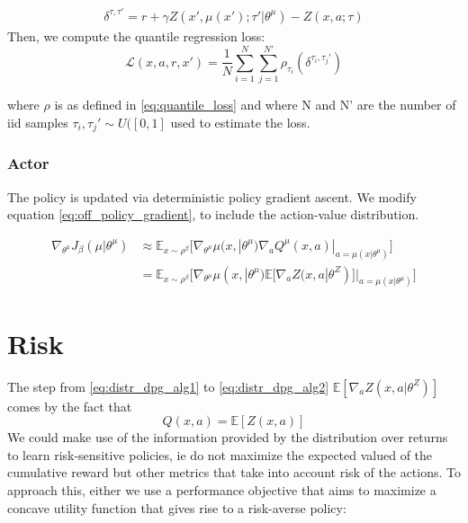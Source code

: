\begin{align}
    \delta^{\tau, \tau'} = r + \gamma Z(x',\mu(x');\tau'| \theta^\mu)-Z(x,a;\tau)
\end{align}
Then, we compute the quantile regression loss:
\begin{equation}
    \mathcal{L}(x,a,r,x')= \frac{1}{N}\sum_{i=1}^{N}\sum_{j=1}^{N'}\rho_{\tau_i}(\delta^{\tau_i, \tau_j'})
\end{equation}

where $\rho$ is as defined in \eqref{eq:quantile_loss} and 
where N and N' are the number of iid samples $\tau_i, \tau_j' \sim U([0,1]$ used to estimate the loss.

\subsubsection{Actor}
The policy is updated via deterministic policy gradient ascent.
We modify equation  \eqref{eq:off_policy_gradient}, to include the action-value distribution.

\begin{align}
    \nabla_{\theta^\mu} J_\beta(\mu | \theta^\mu) &\approx \mathbb E_{x \sim \rho^\beta} 
    \big [\nabla_{\theta^\mu} \mu(x,| \theta^\mu) \nabla_a Q^{\mu}(x,a)|_{a=\mu(x| \theta^\mu)}  \big]\label{eq:distr_dpg_alg1}\\
    &=\mathbb E_{x \sim \rho^\beta} 
    \big [\nabla_{\theta^\mu} \mu(x,| \theta^\mu) \mathbb E [\nabla_a Z(x,a | \theta^Z)]|_{a=\mu(x| \theta^\mu)}  \big]
    \label{eq:distr_dpg_alg2}
\end{align}



\section{Risk}

The step from \eqref{eq:distr_dpg_alg1} to \eqref{eq:distr_dpg_alg2} $\mathbb E [\nabla_a Z(x,a | \theta^Z)]$ comes by the fact that
\begin{equation}
    Q(x,a) = \mathbb E[Z(x,a)] \label{eq:neutral_policy}
\end{equation}
We could make use of the information provided by the distribution over returns to learn 
risk-sensitive policies, ie do not maximize the expected valued of the cumulative reward but other metrics
that take into account risk of the actions.
To approach this, either we use a performance objective that aims to maximize a concave utility function that
gives rise to a risk-averse policy:

